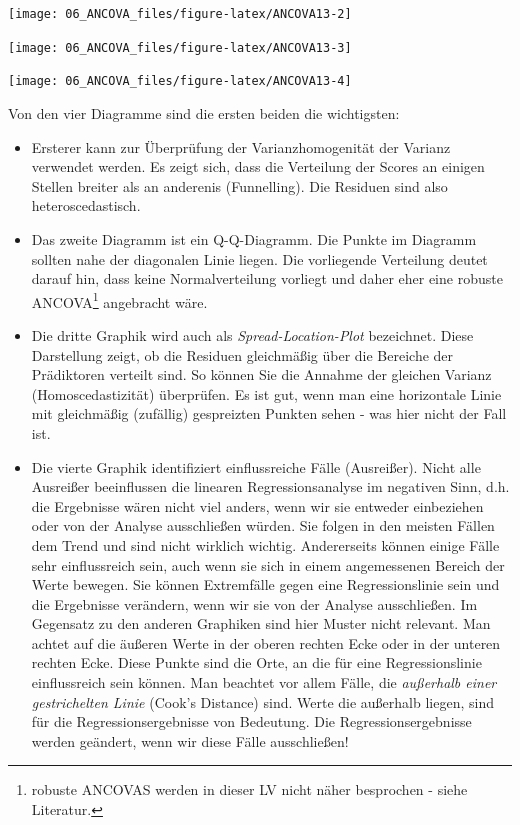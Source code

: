 \documentclass[]{article}
\providecommand{\tightlist}{%
  \setlength{\itemsep}{0pt}\setlength{\parskip}{0pt}}
\let\rmarkdownfootnote\footnote%
\def\footnote{\protect\rmarkdownfootnote}
\begin{document}
\begin{center}\texttt{[image: 06\_ANCOVA\_files/figure-latex/ANCOVA13-2]} \end{center}

\begin{center}\texttt{[image: 06\_ANCOVA\_files/figure-latex/ANCOVA13-3]} \end{center}

\begin{center}\texttt{[image: 06\_ANCOVA\_files/figure-latex/ANCOVA13-4]} \end{center}

Von den vier Diagramme sind die ersten beiden die wichtigsten:

\begin{itemize}
\tightlist
\item
  Ersterer kann zur Überprüfung der Varianzhomogenität der Varianz verwendet werden. Es zeigt sich, dass die Verteilung der Scores an einigen Stellen breiter als an anderenis (Funnelling). Die Residuen sind also heteroscedastisch.
\item
  Das zweite Diagramm ist ein Q-Q-Diagramm. Die Punkte im Diagramm sollten nahe der diagonalen Linie liegen. Die vorliegende Verteilung deutet darauf hin, dass keine Normalverteilung vorliegt und daher eher eine robuste ANCOVA\footnote{robuste ANCOVAS werden in dieser LV nicht näher besprochen - siehe Literatur.} angebracht wäre.
\item
  Die dritte Graphik wird auch als \emph{Spread-Location-Plot} bezeichnet. Diese Darstellung zeigt, ob die Residuen gleichmäßig über die Bereiche der Prädiktoren verteilt sind. So können Sie die Annahme der gleichen Varianz (Homoscedastizität) überprüfen. Es ist gut, wenn man eine horizontale Linie mit gleichmäßig (zufällig) gespreizten Punkten sehen - was hier nicht der Fall ist.
\item
  Die vierte Graphik identifiziert einflussreiche Fälle (Ausreißer). Nicht alle Ausreißer beeinflussen die linearen Regressionsanalyse im negativen Sinn, d.h. die Ergebnisse wären nicht viel anders, wenn wir sie entweder einbeziehen oder von der Analyse ausschließen würden. Sie folgen in den meisten Fällen dem Trend und sind nicht wirklich wichtig. Andererseits können einige Fälle sehr einflussreich sein, auch wenn sie sich in einem angemessenen Bereich der Werte bewegen. Sie können Extremfälle gegen eine Regressionslinie sein und die Ergebnisse verändern, wenn wir sie von der Analyse ausschließen. Im Gegensatz zu den anderen Graphiken sind hier Muster nicht relevant. Man achtet auf die äußeren Werte in der oberen rechten Ecke oder in der unteren rechten Ecke. Diese Punkte sind die Orte, an die für eine Regressionslinie einflussreich sein können. Man beachtet vor allem Fälle, die \emph{außerhalb einer gestrichelten Linie} (Cook's Distance) sind. Werte die außerhalb liegen, sind für die Regressionsergebnisse von Bedeutung. Die Regressionsergebnisse werden geändert, wenn wir diese Fälle ausschließen!
\end{itemize}
\end{document}
